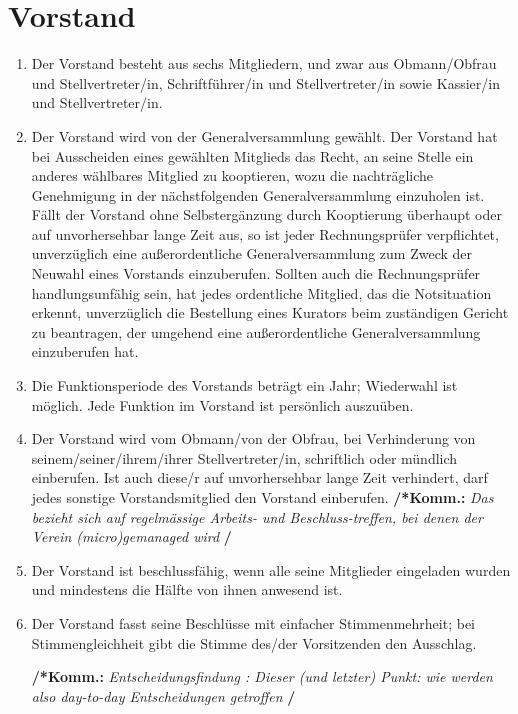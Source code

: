 \documentclass[a4paper,12pt]{article}
\newcommand{\comment}[1]{{\bf /*Komm.:} \textit{#1} {\bf */}}
\begin{document}
\section{Vorstand} %
\begin{enumerate}

\item Der Vorstand besteht aus sechs Mitgliedern, und zwar aus Obmann/Obfrau und Stellvertreter/in, Schriftführer/in und Stellvertreter/in sowie Kassier/in und Stellvertreter/in.
\item Der Vorstand wird von der Generalversammlung gewählt.
Der Vorstand hat bei Ausscheiden eines gewählten Mitglieds das Recht, an seine Stelle ein anderes wählbares Mitglied zu kooptieren, wozu die nachträgliche Genehmigung in der nächstfolgenden Generalversammlung einzuholen ist.
Fällt der Vorstand ohne Selbstergänzung durch Kooptierung überhaupt oder auf unvorhersehbar lange Zeit aus, so ist jeder Rechnungsprüfer verpflichtet, unverzüglich eine außerordentliche Generalversammlung zum Zweck der Neuwahl eines Vorstands einzuberufen.
Sollten auch die Rechnungsprüfer handlungsunfähig sein, hat jedes ordentliche Mitglied, das die Notsituation erkennt, unverzüglich die Bestellung eines Kurators beim zuständigen Gericht zu beantragen, der umgehend eine außerordentliche Generalversammlung einzuberufen hat.

\item \label{item:funktionsperiode} Die Funktionsperiode des Vorstands beträgt ein Jahr; Wiederwahl ist möglich.
Jede Funktion im Vorstand ist persönlich auszuüben.

\item Der Vorstand wird vom Obmann/von der Obfrau, bei Verhinderung von seinem/seiner/ihrem/ihrer Stellvertreter/in, schriftlich oder mündlich einberufen. Ist auch diese/r auf unvorhersehbar lange Zeit verhindert, darf jedes sonstige Vorstandsmitglied den Vorstand einberufen.
\comment{Das bezieht sich auf regelmässige Arbeits- und Beschluss-treffen, bei denen der Verein (micro)gemanaged wird}

\item Der Vorstand ist beschlussfähig, wenn alle seine Mitglieder eingeladen wurden und mindestens die Hälfte von ihnen anwesend ist.

\item Der Vorstand fasst seine Beschlüsse mit einfacher Stimmenmehrheit; bei Stimmengleichheit gibt die Stimme des/der Vorsitzenden den Ausschlag.

\comment{Entscheidungsfindung : Dieser (und letzter) Punkt: wie werden also day-to-day Entscheidungen getroffen }


\end{enumerate}
\end{document}
